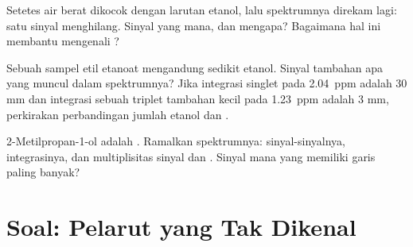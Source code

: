 \begin{exercise}[$\star\star\star$]\label{exo:g12:proton-nmr:13}
Setetes air berat  dikocok dengan larutan etanol, lalu
spektrumnya direkam lagi: satu sinyal menghilang. Sinyal yang mana, dan
mengapa? Bagaimana hal ini membantu mengenali  ?
\end{exercise}

\begin{exercise}[$\star\star\star$]\label{exo:g12:proton-nmr:14}
Sebuah sampel etil etanoat mengandung sedikit etanol. Sinyal tambahan
apa yang muncul dalam spektrumnya? Jika integrasi singlet pada
\qty{2.04}{ppm} adalah 30 mm dan integrasi sebuah triplet tambahan kecil
pada \qty{1.23}{ppm} adalah 3 mm, perkirakan perbandingan jumlah etanol
dan .
\end{exercise}

\begin{exercise}[$\star\star\star$]\label{exo:g12:proton-nmr:15}
2-Metilpropan-1-ol adalah . Ramalkan spektrumnya:
sinyal-sinyalnya, integrasinya, dan multiplisitas sinyal  dan
. Sinyal mana yang memiliki garis paling banyak?
\end{exercise}

\section{Soal: Pelarut yang Tak Dikenal}

